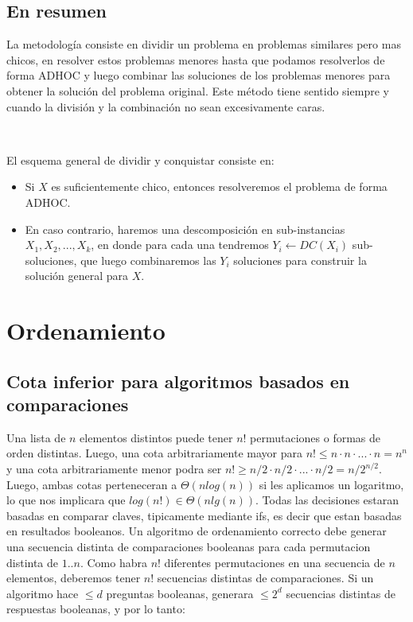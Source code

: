 \subsection{En resumen}

La metodolog\'ia consiste en dividir un problema en problemas similares pero mas chicos, en resolver estos problemas menores hasta que podamos resolverlos de forma ADHOC y luego combinar las soluciones de los problemas menores para obtener la soluci\'on del problema original. Este m\'etodo tiene sentido siempre y cuando la divisi\'on y la combinaci\'on no sean excesivamente caras.

~

El esquema general de dividir y conquistar consiste en:

\begin{itemize}
 \item Si $X$ es suficientemente chico, entonces resolveremos el problema de forma ADHOC.
 \item En caso contrario, haremos una descomposici\'on en sub-instancias $X_1, X_2, ..., X_k$, en donde para cada una tendremos $Y_i \gets DC(X_i)$ sub-soluciones, que luego combinaremos las $Y_i$ soluciones para construir la soluci\'on general para $X$.
\end{itemize}

\newpage

\section{Ordenamiento}

\subsection{Cota inferior para algoritmos basados en comparaciones}

Una lista de $n$ elementos distintos puede tener $n!$ permutaciones o formas de orden distintas. Luego, una cota arbitrariamente mayor para $n! \leq n \cdot n \cdot ... \cdot n = n^n$ y una cota arbitrariamente menor podra ser $n! \geq n/2 \cdot n/2 \cdot ... \cdot n/2 = n/2^{n/2}$. Luego, ambas cotas perteneceran a $\Theta(n log(n))$ si les aplicamos un logaritmo, lo que nos implicara que $log(n!) \in \Theta(n lg(n))$.
Todas las decisiones estaran basadas en comparar claves, tipicamente mediante ifs, es decir que estan basadas en resultados booleanos. Un algoritmo de ordenamiento correcto debe generar una secuencia distinta de comparaciones booleanas para cada permutacion distinta de $1.. n$. Como habra $n!$ diferentes permutaciones en una secuencia de $n$ elementos, deberemos tener $n!$ secuencias distintas de comparaciones. Si un algoritmo hace $\leq d$ preguntas booleanas, generara $\leq 2^d$ secuencias distintas de respuestas booleanas, y por lo tanto:

